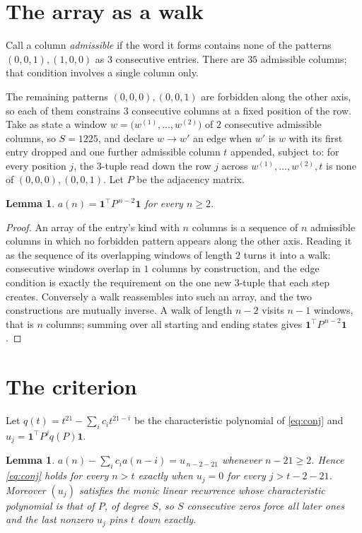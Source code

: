 \documentclass[11pt,a4paper]{article}
\theoremstyle{plain}
\newtheorem{lemma}[theorem]{Lemma}
\theoremstyle{definition}
\begin{document}
\section{The array as a walk}

Call a column \emph{admissible} if the word it forms contains none of the patterns
$(0,0,1), (1,0,0)$ as $3$ consecutive entries. There are $35$ admissible columns; that condition
involves a single column only.

The remaining patterns $(0,0,0), (0,0,1)$ are forbidden along the other axis, so each of them
constrains $3$ consecutive columns at a fixed position of the row. Take as state a
window $w=\bigl(w^{(1)},\dots,w^{(2)}\bigr)$ of $2$ consecutive admissible
columns, so $S=1225$, and declare $w\to w'$ an edge when $w'$ is $w$ with its first entry
dropped and one further admissible column $t$ appended, subject to: for every position
$j$, the $3$-tuple read down the row $j$ across $w^{(1)},\dots,w^{(2)},t$
is none of $(0,0,0), (0,0,1)$. Let $P$ be the adjacency matrix.

\begin{lemma}\label{lem:walk}
$a(n)=\mathbf{1}^{\!\top}P^{\,n-2}\mathbf{1}$ for every $n\ge2$.
\end{lemma}

\begin{proof}
An array of the entry's kind with $n$ columns is a sequence of $n$ admissible columns in
which no forbidden pattern appears along the other axis. Reading it as the sequence of its
overlapping windows of length $2$ turns it into a walk: consecutive windows overlap in
$1$ columns by construction, and the edge condition is exactly the requirement on the one
new $3$-tuple that each step creates. Conversely a walk reassembles into such an array,
and the two constructions are mutually inverse. A walk of length $n-2$ visits $n-1$
windows, that is $n$ columns; summing over all starting and ending states gives
$\mathbf{1}^{\!\top}P^{\,n-2}\mathbf{1}$.
\end{proof}

\section{The criterion}

Let $q(t)=t^{21}-\sum_i c_i t^{21-i}$ be the characteristic polynomial of
\eqref{eq:conj} and $u_j=\mathbf{1}^{\!\top}P^{j}q(P)\mathbf{1}$.

\begin{lemma}\label{lem:crit}
$a(n)-\sum_i c_i a(n-i)=u_{\,n-2-21}$ whenever $n-21\ge2$. Hence
\eqref{eq:conj} holds for every $n>t$ exactly when $u_j=0$ for every
$j>t-2-21$. Moreover $(u_j)$ satisfies the monic linear recurrence whose
characteristic polynomial is that of $P$, of degree $S$, so $S$ consecutive zeros force all
later ones and the last nonzero $u_j$ pins $t$ down exactly.
\end{lemma}
\end{document}
